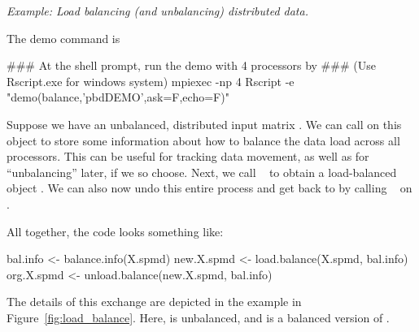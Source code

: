 \emph{Example:  Load balancing (and unbalancing) distributed data.}

The demo command is
\begin{Command}
### At the shell prompt, run the demo with 4 processors by
### (Use Rscript.exe for windows system)
mpiexec -np 4 Rscript -e "demo(balance,'pbdDEMO',ask=F,echo=F)"
\end{Command}

Suppose we have an unbalanced, distributed input matrix .  We can 
call  on this object to store some information about how to 
balance the data load across all processors.  This can be useful for tracking 
data movement, as well as for ``unbalancing'' later, if we so choose.  Next, we 
call
~
to obtain a load-balanced object .  We can also now undo this entire process and get back to  by calling
~ on .


All together, the code looks something like:
\begin{Code}[title=R Code]
bal.info <- balance.info(X.spmd)
new.X.spmd <- load.balance(X.spmd, bal.info)
org.X.spmd <- unload.balance(new.X.spmd, bal.info)
\end{Code}

The details of this exchange are depicted in the example in Figure~\ref{fig:load_balance}.  Here, 
 is unbalanced, and  is a balanced version of .

